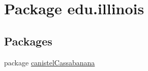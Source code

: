 \hypertarget{namespaceedu_1_1illinois}{
\section{Package edu.illinois}
\label{namespaceedu_1_1illinois}
}
\subsection*{Packages}
\begin{DoxyCompactItemize}
\item 
package \hyperlink{namespaceedu_1_1illinois_1_1canistelCassabanana}{canistelCassabanana}
\end{DoxyCompactItemize}

